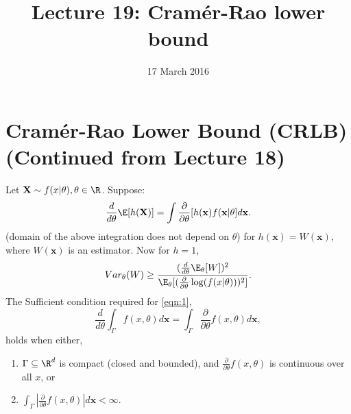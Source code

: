 \documentclass[a4paper,english,12pt]{article}
\title{Lecture 19: Cram\'{e}r-Rao lower bound}
\date{17 March 2016}
\newcommand{\bx}{\mathbf{x}}
\newcommand{\bX}{\mathbf{X}}
\begin{document}
\author{}
\maketitle
\section{Cram\'{e}r-Rao Lower Bound (CRLB)(Continued from Lecture 18)}
Let $\bX \sim f(x|\theta), \theta \in \R$.
Suppose:
\begin{equation}\label{eqn:1}
	\frac{d}{d\theta} \E[h(\bX)]=\int \frac{\partial}{\partial\theta} [h(\bx)f(\bx|\theta] d\bx.
\end{equation}
(domain of the above integration does not depend on $\theta$) for $h(\bx)= W(\bx)$, where $W(\bx)$ is an estimator. Now for $h = 1$,
 \begin{equation}
 Var_{\theta} (W) \geq \frac{(\frac{d}{d\theta} \E_{\theta}[W])^2}{\E_{\theta}[(\frac{\partial}{\partial\theta} \log (f(x|\theta)))^2]}.
 \end{equation}
 The Sufficient condition required for \eqref{eqn:1},
 \begin{equation}
 \frac{d}{d\theta} \int_{\Gamma} f(x,\theta) d\bx = \int_{\Gamma} \frac{\partial}{\partial\theta}  f(x,\theta) d\bx,
 \end{equation}
holds when either,
 \begin{enumerate}
 	\item $\Gamma \subseteq \R^d $ is compact (closed and bounded), and $\frac{\partial}{\partial\theta}  f(x,\theta)$ is continuous over all $x$, or
 	\item $\int_{\Gamma} |\frac{\partial}{\partial\theta}  f(x,\theta)| d\bx <\infty$.
 \end{enumerate}
\end{document}
